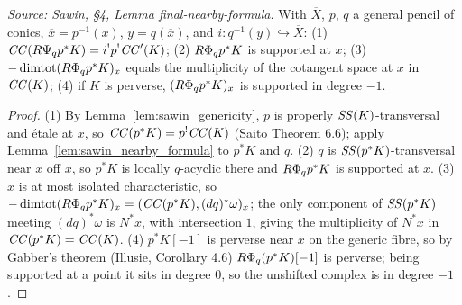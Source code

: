 \begin{lemma}
  \label{lem:sawin_final_nearby_formula}
  \textit{Source: Sawin, §4, Lemma final-nearby-formula.}
  With $\overline X$, $p$, $q$ a general pencil of conics, $\overline x=p^{-1}(x)$,
  $y=q(\overline x)$, and $i:q^{-1}(y)\hookrightarrow\overline X$:
  (1) $\mathit{CC}(R\Psi_q p^*K)=i^!p^!\mathit{CC}'(K)$;
  (2) $R\Phi_q p^*K$ is supported at $x$;
  (3) $-\operatorname{dimtot}(R\Phi_q p^*K)_x$ equals the multiplicity of the cotangent space at
  $x$ in $\mathit{CC}(K)$;
  (4) if $K$ is perverse, $(R\Phi_q p^*K)_x$ is supported in degree $-1$.
\end{lemma}
\begin{proof}
  (1) By Lemma~\ref{lem:sawin_genericity}, $p$ is properly $\mathit{SS}(K)$-transversal
  and étale at $x$, so $\mathit{CC}(p^*K)=p^!\mathit{CC}(K)$ (Saito Theorem 6.6); apply
  Lemma~\ref{lem:sawin_nearby_formula} to $p^*K$ and $q$.
  (2) $q$ is $\mathit{SS}(p^*K)$-transversal near $x$ off $x$, so $p^*K$ is locally
  $q$-acyclic there and $R\Phi_q p^*K$ is supported at $x$.
  (3) $x$ is at most isolated characteristic, so
  $-\operatorname{dimtot}(R\Phi_q p^*K)_x = (\mathit{CC}(p^*K),(dq)^*\omega)_x$; the only component of
  $\mathit{SS}(p^*K)$ meeting $(dq)^*\omega$ is $N^*x$, with intersection $1$, giving
  the multiplicity of $N^*x$ in $\mathit{CC}(p^*K)=\mathit{CC}(K)$.
  (4) $p^*K[-1]$ is perverse near $x$ on the generic fibre, so by Gabber's theorem
  (Illusie, Corollary 4.6) $R\Phi_q(p^*K)[-1]$ is perverse; being supported at a
  point it sits in degree $0$, so the unshifted complex is in degree $-1$.
\end{proof}


